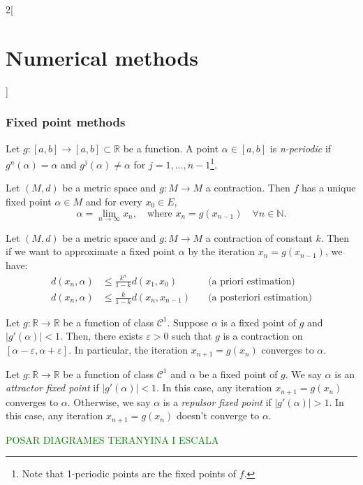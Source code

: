 \documentclass[class=article,10pt,crop=false]{standalone}
\begin{document}
\begin{multicols}{2}[\section{Numerical methods}]
\subsubsection*{Fixed point methods}
\begin{definition}
Let $g:[a,b]\rightarrow[a,b]\subset\mathbb{R}$ be a function. A point $\alpha\in[a,b]$ is \textit{n-periodic} if $g^n(\alpha)=\alpha$ and $g^j(\alpha)\ne\alpha$ for $j=1,\ldots,n-1$\footnote{Note that 1-periodic points are the fixed points of $f$.}.
\end{definition}
\begin{theorem}
Let $(M,d)$ be a metric space and $g:M\rightarrow M$ a contraction. Then $f$ has a unique fixed point $\alpha\in M$ and for every $x_0\in E$, $$\alpha=\lim_{n\to\infty}x_n,\quad\text{where }x_n=g(x_{n-1})\quad\forall n\in\mathbb{N}.$$
\end{theorem}
\begin{prop}
Let $(M,d)$ be a metric space and $g:M\rightarrow M$ a contraction of constant $k$. Then if we want to approximate a fixed point $\alpha$ by the iteration $x_n=g(x_{n-1})$, we have:
\begin{align*}
    d(x_n,\alpha)&\leq\frac{k^n}{1-k}d(x_1,x_0)\quad&\text{(a priori estimation)}\\
    d(x_n,\alpha)&\leq\frac{k}{1-k}d(x_n,x_{n-1})\quad&\text{(a posteriori estimation)}
\end{align*}
\end{prop}
\begin{corollary}
Let $g:\mathbb{R}\rightarrow\mathbb{R}$ be a function of class $\mathcal{C}^1$. Suppose $\alpha$ is a fixed point of $g$ and $|g'(\alpha)|<1$. Then, there exists $\varepsilon>0$ such that $g$ is a contraction on $[\alpha-\varepsilon,\alpha+\varepsilon]$. In particular, the iteration $x_{n+1}=g(x_n)$ converges to $\alpha$.
\end{corollary}
\begin{definition}
Let $g:\mathbb{R}\rightarrow\mathbb{R}$ be a function of class $\mathcal{C}^1$ and $\alpha$ be a fixed point of $g$. We say $\alpha$ is an \textit{attractor fixed point} if $|g'(\alpha)|<1$. In this case, any iteration $x_{n+1}=g(x_n)$ converges to $\alpha$. Otherwise, we say $\alpha$ is a \textit{repulsor fixed point} if $|g'(\alpha)|>1$. In this case, any iteration $x_{n+1}=g(x_n)$ doesn't converge to $\alpha$.
\end{definition}
\textcolor{green}{POSAR DIAGRAMES TERANYINA I ESCALA}

\end{multicols}
\end{document}
